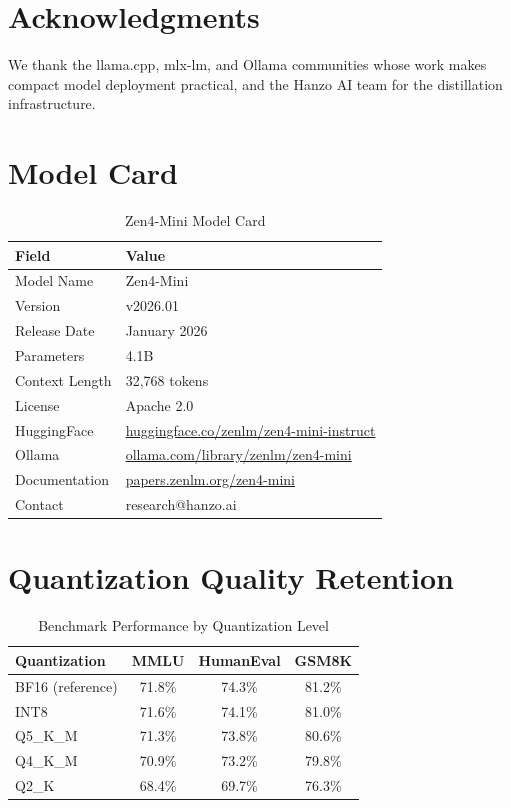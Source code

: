 \documentclass[11pt,a4paper]{article}
\begin{document}
\section*{Acknowledgments}

We thank the llama.cpp, mlx-lm, and Ollama communities whose work makes compact model
deployment practical, and the Hanzo AI team for the distillation infrastructure.




\appendix

\section{Model Card}

\begin{table}[H]
\centering
\begin{tabular}{ll}
\toprule
\textbf{Field} & \textbf{Value} \\
\midrule
Model Name      & Zen4-Mini \\
Version         & v2026.01 \\
Release Date    & January 2026 \\
Parameters      & 4.1B \\
Context Length  & 32,768 tokens \\
License         & Apache 2.0 \\
HuggingFace     & \href{https://huggingface.co/zenlm/zen4-mini-instruct}{huggingface.co/zenlm/zen4-mini-instruct} \\
Ollama          & \href{https://ollama.com/library/zenlm/zen4-mini}{ollama.com/library/zenlm/zen4-mini} \\
Documentation   & \href{https://papers.zenlm.org/zen4-mini}{papers.zenlm.org/zen4-mini} \\
Contact         & research@hanzo.ai \\
\bottomrule
\end{tabular}
\caption{Zen4-Mini Model Card}
\end{table}

\section{Quantization Quality Retention}

\begin{table}[H]
\centering
\begin{tabular}{lccc}
\toprule
\textbf{Quantization} & \textbf{MMLU} & \textbf{HumanEval} & \textbf{GSM8K} \\
\midrule
BF16 (reference)  & 71.8\% & 74.3\% & 81.2\% \\
INT8              & 71.6\% & 74.1\% & 81.0\% \\
Q5\_K\_M          & 71.3\% & 73.8\% & 80.6\% \\
Q4\_K\_M          & 70.9\% & 73.2\% & 79.8\% \\
Q2\_K             & 68.4\% & 69.7\% & 76.3\% \\
\bottomrule
\end{tabular}
\caption{Benchmark Performance by Quantization Level}
\end{table}
\end{document}

